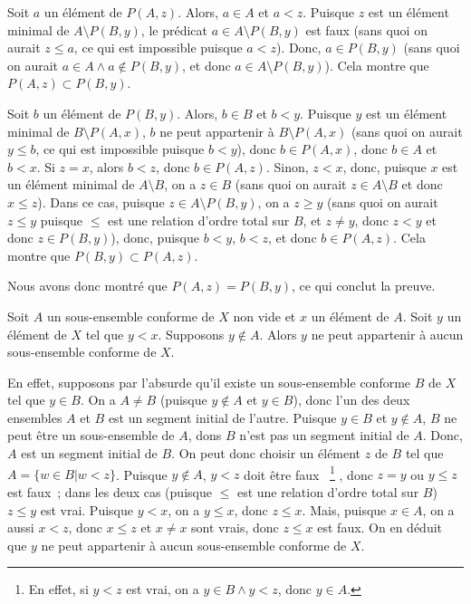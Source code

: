    Soit $a$ un élément de $P(A,z)$. 
    Alors, $a \in A$ et $a < z$. 
    Puisque $z$ est un élément minimal de $A \setminus P(B,y)$, le prédicat $a \in A \setminus P(B,y)$ est faux (sans quoi on aurait $z \leq a$, ce qui est impossible puisque $a < z$).
    Donc, $a \in P(B,y)$ (sans quoi on aurait $a \in A \wedge a \notin P(B,y)$, et donc $a \in A \setminus P(B,y)$).
    Cela montre que $P(A,z) \subset P(B,y)$.

    Soit $b$ un élément de $P(B,y)$. 
    Alors, $b \in B$ et $b < y$.
    Puisque $y$ est un élément minimal de $B \setminus P(A,x)$, $b$ ne peut appartenir à $B \setminus P(A,x)$ (sans quoi on aurait $y \leq b$, ce qui est impossible puisque $b < y$), donc $b \in P(A,x)$, donc $b \in A$ et $b < x$.
    Si $z = x$, alors $b < z$, donc $b \in P(A, z)$.
    Sinon, $z < x$, donc, puisque $x$ est un élément minimal de $A \setminus B$, on a $z \in B$ (sans quoi on aurait $z \in A \setminus B$ et donc $x \leq z$). 
    Dans ce cas, puisque $z \in A \setminus P(B, y)$, on a $z \geq y$ (sans quoi on aurait $z \leq y$ puisque $\leq$ est une relation d'ordre total sur $B$, et $z \neq y$, donc $z < y$ et donc $z \in P(B,y)$), donc, puisque $b < y$, $b < z$, et donc $b \in P(A, z)$.
    Cela montre que $P(B, y) \subset P(A, z)$.

    Nous avons donc montré que $P(A, z) = P(B, y)$, ce qui conclut la preuve.

    \done

\medskip

Soit $A$ un sous-ensemble conforme de $X$ non vide et $x$ un élément de $A$. 
Soit $y$ un élément de $X$ tel que $y < x$. 
Supposons $y \notin A$. 
Alors $y$ ne peut appartenir à aucun sous-ensemble conforme de $X$. 

En effet, supposons par l'absurde qu'il existe un sous-ensemble conforme $B$ de $X$ tel que $y \in B$. 
On a $A \neq B$ (puisque $y \notin A$ et $y \in B$), donc l'un des deux ensembles $A$ et $B$ est un segment initial de l'autre.
Puisque $y \in B$ et $y \notin A$, $B$ ne peut être un sous-ensemble de $A$, dons $B$ n'est pas un segment initial de $A$. 
Donc, $A$ est un segment initial de $B$. 
On peut donc choisir un élément $z$ de $B$ tel que $A = \lbrace w \in B \vert w < z \rbrace$. 
Puisque $y \notin A$, $y < z$ doit être faux%
~\footnote{En effet, si $y < z$ est vrai, on a $y \in B \wedge y < z$, donc $y \in A$.}%
, donc $z = y$ ou $y \leq z$ est faux ; dans les deux cas (puisque $\leq$ est une relation d'ordre total sur $B$) $z \leq y$ est vrai. 
Puisque $y < x$, on a $y \leq x$, donc $z \leq x$. 
Mais, puisque $x \in A$, on a aussi $x < z$, donc $x \leq z$ et $x \neq x$ sont vrais, donc $z \leq x$ est faux. 
On en déduit que $y$ ne peut appartenir à aucun sous-ensemble conforme de $X$. 

